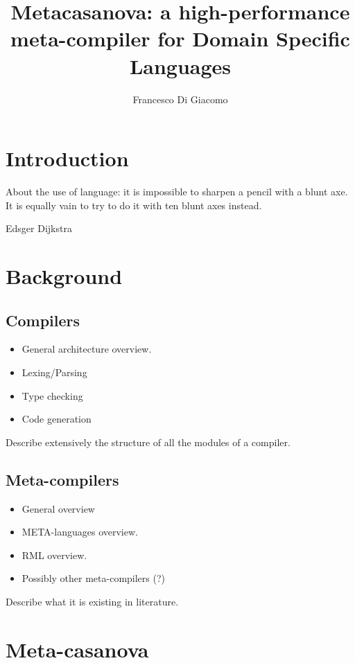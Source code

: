 \documentclass[8pt,a5paper]{extbook}
\author{Francesco Di Giacomo}
\title{Metacasanova: a high-performance meta-compiler for Domain Specific Languages}
\date { }
\begin{document}
\maketitle

\tableofcontents


\chapter{Introduction}
\epigraph{About the use of language: it is impossible to sharpen a pencil with a blunt axe. It is equally vain to try to do it with ten blunt axes instead.}{Edsger Dijkstra}

\label{ch:introduction}
	

\chapter{Background}
\section{Compilers}

\begin{itemize}[noitemsep]
	\item General architecture overview.
	\item Lexing/Parsing
	\item Type checking
	\item Code generation
\end{itemize}

Describe extensively the structure of all the modules of a compiler.

\section{Meta-compilers}

\begin{itemize}[noitemsep]
	\item General overview
	\item META-languages overview.
	\item RML overview.
	\item Possibly other meta-compilers (?)
\end{itemize}

Describe what it is existing in literature.
	
\chapter{Meta-casanova}		
\end{document}

